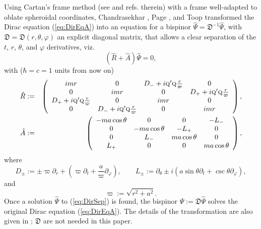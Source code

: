 \documentclass[11 pt]{article}
\renewcommand\({\left(}
\renewcommand\){\right)}
\newcommand\<{\langle}
\renewcommand\>{\rangle}
\newcommand\8{\infty}
\newcommand\beq{\begin{equation}}
\newcommand\eeq{\end{equation}}
\newcommand{\pd}{\partial}
\newcommand{\fD}{\mathfrak{D}}
\newcommand{\De}{\varpi}
\newcommand{\bna}{\begin{eqnarray}}
\newcommand{\ena}{\end{eqnarray}}
\begin{document}
 Using Cartan's frame method (see \cite{BrillCohen66} and refs. therein) with a frame  well-adapted to oblate spheroidal coordinates,
 Chandrasekhar \cite{Chandra76a,Chandra76b}, Page \cite{Page76}, and Toop \cite{Toop76}
 transformed  the Dirac equation (\ref{eq:DirEqA}) into an equation for a bispinor $\hat{\Psi}= \fD^{-1} \hat{\Psi}$, 
 with $\fD = \fD(r,\theta,\varphi)$ an explicit diagonal matrix, that allows a clear separation of the $t$, $r$, $\theta$, and $\varphi$ derivatives, viz.
\beq\label{eq:DirSep}
(\hat{R} +\hat{A}) \hat{\Psi} = 0,
\eeq
with ($\hbar = c = 1$ units from now on)
\bna
\hat{R}& := & \left(\begin{array}{cccc} imr & 0 &D_- + i \textsc{q}'\textsc{q}\frac{r}{\varpi} & 0 \\
0 & imr & 0 & D_+ + i\textsc{q}'\textsc{q}\frac{r}{\varpi}\\
D_+ + i \textsc{q}'\textsc{q}\frac{r}{\varpi} & 0 & imr & 0 \\
0 & D_- +i\textsc{q}'\textsc{q}\frac{r}{\varpi} & 0 & imr \end{array} \right),\\
\hat{A} &:= & \left(\begin{array}{cccc} -m a \cos\theta & 0 & 0 & -L_- \\
0 & -ma\cos\theta & -L_+ &0 \\
0 & L_- & ma\cos\theta & 0 \\
L_+ & 0 & 0 & ma\cos\theta
\end{array}\right),
\ena
where
\beq\label{eq:DpmLpm}
D_\pm := \pm \De \pd_r + \left( \De \pd_t + \frac{a}{\De} \pd_\varphi\right),
\qquad 
L_\pm :=\pd_\theta  \pm i \left( a\sin\theta \pd_t+\csc\theta \pd_\varphi\right),
\eeq
and
\[
\varpi := \sqrt{r^2 + a^2}.
\]
 Once a solution $\hat{\Psi}$ to (\ref{eq:DirSep}) is found, the bispinor $\Psi := \fD\hat{\Psi}$
solves the original Dirac equation (\ref{eq:DirEqA}).
 The details of the transformation are also given in \cite{KTZzGKNDa}; $\fD$ are not needed in this paper.
\end{document}
